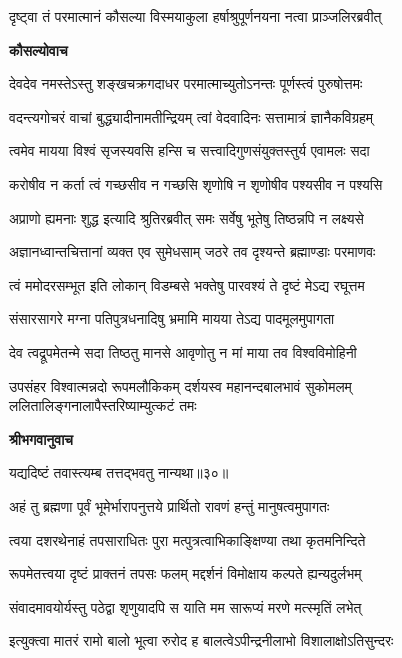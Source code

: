 \twolineshloka
{दृष्ट्वा तं परमात्मानं कौसल्या विस्मयाकुला}
{हर्षाश्रुपूर्णनयना नत्वा प्राञ्जलिरब्रवीत्} %

\textbf{कौसल्योवाच}

\twolineshloka
{देवदेव नमस्तेऽस्तु शङ्खचक्रगदाधर}
{परमात्माच्युतोऽनन्तः पूर्णस्त्वं पुरुषोत्तमः} %

\twolineshloka
{वदन्त्यगोचरं वाचां बुद्ध्यादीनामतीन्द्रियम्}
{त्वां वेदवादिनः सत्तामात्रं ज्ञानैकविग्रहम्} %

\twolineshloka
{त्वमेव मायया विश्वं सृजस्यवसि हन्सि च}
{सत्त्वादिगुणसंयुक्तस्तुर्य एवामलः सदा} %

\twolineshloka
{करोषीव न कर्ता त्वं गच्छसीव न गच्छसि}
{शृणोषि न शृणोषीव पश्यसीव न पश्यसि} %

\twolineshloka
{अप्राणो ह्यमनाः शुद्ध इत्यादि श्रुतिरब्रवीत्}
{समः सर्वेषु भूतेषु तिष्ठन्नपि न लक्ष्यसे} %

\twolineshloka
{अज्ञानध्वान्तचित्तानां व्यक्त एव सुमेधसाम्}
{जठरे तव दृश्यन्ते ब्रह्माण्डाः परमाणवः} %

\twolineshloka
{त्वं ममोदरसम्भूत इति लोकान् विडम्बसे}
{भक्तेषु पारवश्यं ते दृष्टं मेऽद्य रघूत्तम} %

\twolineshloka
{संसारसागरे मग्ना पतिपुत्रधनादिषु}
{भ्रमामि मायया तेऽद्य पादमूलमुपागता} %

\twolineshloka
{देव त्वद्रूपमेतन्मे सदा तिष्ठतु मानसे}
{आवृणोतु न मां माया तव विश्वविमोहिनी} %

\threelineshloka
{उपसंहर विश्वात्मन्नदो रूपमलौकिकम्}
{दर्शयस्व महानन्दबालभावं सुकोमलम्}
{ललितालिङ्गनालापैस्तरिष्याम्युत्कटं तमः} %

\textbf{श्रीभगवानुवाच}

{यद्यदिष्टं तवास्त्यम्ब तत्तद्भवतु नान्यथा॥३०॥} %


\twolineshloka
{अहं तु ब्रह्मणा पूर्वं भूमेर्भारापनुत्तये}
{प्रार्थितो रावणं हन्तुं मानुषत्वमुपागतः} %

\twolineshloka
{त्वया दशरथेनाहं तपसाराधितः पुरा}
{मत्पुत्रत्वाभिकाङ्क्षिण्या तथा कृतमनिन्दिते} %

\twolineshloka
{रूपमेतत्त्वया दृष्टं प्राक्तनं तपसः फलम्}
{मद्दर्शनं विमोक्षाय कल्पते ह्यन्यदुर्लभम्} %

\twolineshloka
{संवादमावयोर्यस्तु पठेद्वा शृणुयादपि}
{स याति मम सारूप्यं मरणे मत्स्मृतिं लभेत्} %

\twolineshloka
{इत्युक्त्वा मातरं रामो बालो भूत्वा रुरोद ह}
{बालत्वेऽपीन्द्रनीलाभो विशालाक्षोऽतिसुन्दरः} %

